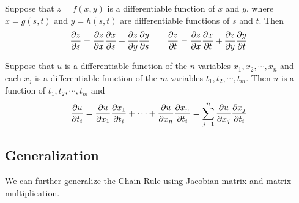 \begin{theorem}
Suppose that $z=f(x,y)$ is a differentiable function of $x$ and $y$, where $x = g(s,t)$ and $y=h(s,t)$ are differentiable functions of $s$ and $t$. Then
$$
\frac{\partial z}{\partial s} = \frac{\partial z}{\partial x}\frac{\partial x}{\partial s} + \frac{\partial z}{\partial y}\frac{\partial y}{\partial s} \qquad \frac{\partial z}{\partial t} = \frac{\partial z}{\partial x}\frac{\partial x}{\partial t} + \frac{\partial z}{\partial y}\frac{\partial y}{\partial t}
$$
\end{theorem}

\begin{center}
\end{center}

\begin{theorem}
Suppose that $u$ is a differentiable function of the $n$ variables $x_1, x_2, \cdots , x_n$ and each $x_j$ is a differentiable function of the $m$ variables $t_1, t_2, \cdots , t_m$. Then $u$ is a function of $t_1, t_2, \cdots, t_m$ and
$$
\frac{\partial u}{\partial t_i} = \frac{\partial u}{\partial x_1}\frac{\partial x_1}{\partial t_i} + \cdots + \frac{\partial u}{\partial x_n}\frac{\partial x_n}{\partial t_i} = \sum_{j=1}^n \frac{\partial u}{\partial x_j}\frac{\partial x_j}{\partial t_i}
$$
\end{theorem}

\subsection{Generalization}
We can further generalize the Chain Rule using Jacobian matrix and matrix multiplication.

